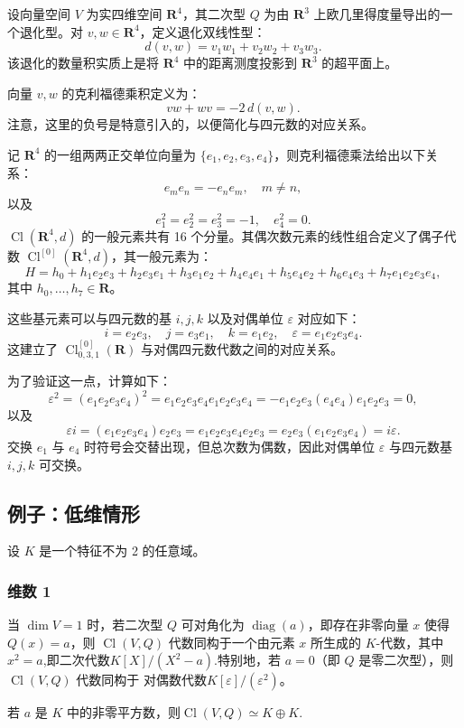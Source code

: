 设向量空间 $V$ 为实四维空间 $\mathbf{R}^4$，其二次型 $Q$ 为由 $\mathbf{R}^3$ 上欧几里得度量导出的一个退化型。对 $v, w \in \mathbf{R}^4$，定义退化双线性型：
$$
d(v, w) = v_1 w_1 + v_2 w_2 + v_3 w_3.~
$$
该退化的数量积实质上是将 $\mathbf{R}^4$ 中的距离测度投影到 $\mathbf{R}^3$ 的超平面上。

向量 $v, w$ 的克利福德乘积定义为：
$$
vw + wv = - 2\, d(v, w).~
$$
注意，这里的负号是特意引入的，以便简化与四元数的对应关系。

记 $\mathbf{R}^4$ 的一组两两正交单位向量为 $\{e_1, e_2, e_3, e_4\}$，则克利福德乘法给出以下关系：
$$
e_m e_n = - e_n e_m, \quad m \neq n,~
$$
以及
$$
e_1^2 = e_2^2 = e_3^2 = -1, \quad e_4^2 = 0.~
$$
$\operatorname{Cl}(\mathbf{R}^4, d)$ 的一般元素共有 16 个分量。其偶次数元素的线性组合定义了偶子代数 $\operatorname{Cl}^{[0]}(\mathbf{R}^4, d)$，其一般元素为：
$$
H = h_0 + h_1 e_2 e_3 + h_2 e_3 e_1 + h_3 e_1 e_2 + h_4 e_4 e_1 + h_5 e_4 e_2 + h_6 e_4 e_3 + h_7 e_1 e_2 e_3 e_4,~
$$
其中 $h_0, \ldots, h_7 \in \mathbf{R}$。

这些基元素可以与四元数的基 $i, j, k$ 以及对偶单位 $\varepsilon$ 对应如下：
$$
i = e_2 e_3, \quad j = e_3 e_1, \quad k = e_1 e_2, \quad \varepsilon = e_1 e_2 e_3 e_4.~
$$
这建立了 $\operatorname{Cl}^{[0]}_{0,3,1}(\mathbf{R})$ 与对偶四元数代数之间的对应关系。

为了验证这一点，计算如下：
$$
\varepsilon^2 = (e_1 e_2 e_3 e_4)^2 = e_1 e_2 e_3 e_4 e_1 e_2 e_3 e_4 
= - e_1 e_2 e_3 (e_4 e_4) e_1 e_2 e_3 = 0,~
$$
以及
$$
\varepsilon i = (e_1 e_2 e_3 e_4) e_2 e_3 = e_1 e_2 e_3 e_4 e_2 e_3 
= e_2 e_3 (e_1 e_2 e_3 e_4) = i \varepsilon.~
$$
交换 $e_1$ 与 $e_4$ 时符号会交替出现，但总次数为偶数，因此对偶单位 $\varepsilon$ 与四元数基 $i, j, k$ 可交换。
\subsection{例子：低维情形}
设 $K$ 是一个特征不为 2 的任意域。
\subsubsection{维数 1}
当 $\dim V = 1$ 时，若二次型 $Q$ 可对角化为 $\operatorname{diag}(a)$，即存在非零向量 $x$ 使得 $Q(x) = a$，则 $\operatorname{Cl}(V, Q)$ 代数同构于一个由元素 $x$ 所生成的 $K$-代数，其中$x^2 = a$,即二次代数$K[X] / (X^2 - a)$.特别地，若 $a = 0$（即 $Q$ 是零二次型），则 $\operatorname{Cl}(V, Q)$ 代数同构于 对偶数代数$K[\varepsilon]/(\varepsilon^2)$。

若 $a$ 是 $K$ 中的非零平方数，则$\operatorname{Cl}(V, Q) \simeq K \oplus K$.

